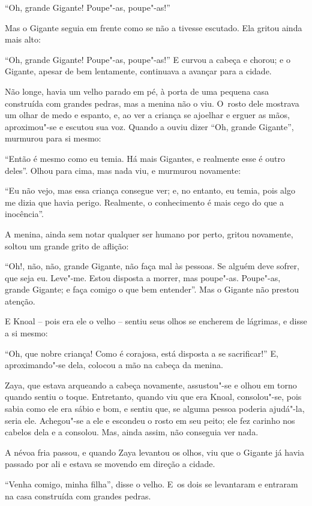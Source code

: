 ``Oh, grande Gigante! Poupe"-as, poupe"-as!''

Mas o Gigante seguia em frente como se não a tivesse escutado. Ela
gritou ainda mais alto:

``Oh, grande Gigante! Poupe"-as, poupe"-as!'' E curvou a cabeça e chorou;
e o Gigante, apesar de bem lentamente, continuava a avançar para a
cidade.

Não longe, havia um velho parado em pé, à porta de uma pequena casa
construída com grandes pedras, mas a menina não o viu. O~rosto dele
mostrava um olhar de medo e espanto, e, ao ver a criança se ajoelhar e
erguer as mãos, aproximou"-se e escutou sua voz. Quando a ouviu dizer
``Oh, grande Gigante'', murmurou para si mesmo:

``Então é mesmo como eu temia. Há mais Gigantes, e realmente esse é
outro deles''. Olhou para cima, mas nada viu, e murmurou novamente:

``Eu não vejo, mas essa criança consegue ver; e, no entanto, eu temia,
pois algo me dizia que havia perigo. Realmente, o conhecimento é mais
cego do que a inocência''.

A menina, ainda sem notar qualquer ser humano por perto, gritou
novamente, soltou um grande grito de aflição:

``Oh!, não, não, grande Gigante, não faça mal às pessoas. Se alguém deve
sofrer, que seja eu. Leve"-me. Estou disposta a morrer, mas poupe"-as.
Poupe"-as, grande Gigante; e faça comigo o que bem entender''. Mas o
Gigante não prestou atenção.

E Knoal -- pois era ele o velho -- sentiu seus olhos se encherem de
lágrimas, e disse a si mesmo:

``Oh, que nobre criança! Como é corajosa, está disposta a se
sacrificar!'' E, aproximando"-se dela, colocou a mão na cabeça da menina.

Zaya, que estava arqueando a cabeça novamente, assustou"-se e olhou em
torno quando sentiu o toque. Entretanto, quando viu que era Knoal,
consolou"-se, pois sabia como ele era sábio e bom, e sentiu que, se
alguma pessoa poderia ajudá"-la, seria ele. Achegou"-se a ele e escondeu o
rosto em seu peito; ele fez carinho nos cabelos dela e a consolou. Mas,
ainda assim, não conseguia ver nada.

A névoa fria passou, e quando Zaya levantou os olhos, viu que o Gigante
já havia passado por ali e estava se movendo em direção a cidade.

``Venha comigo, minha filha'', disse o velho. E~os dois se levantaram e
entraram na casa construída com grandes pedras.

